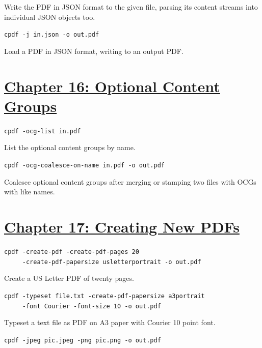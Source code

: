 \documentclass{book}
\begin{document}
\noindent Write the PDF in JSON format to the given file, parsing its content streams into individual JSON objects too.

\begin{framed}\noindent\texttt{cpdf -j in.json -o out.pdf}\end{framed}

\noindent Load a PDF in JSON format, writing to an output PDF.

\section*{\hyperref[chap:16]{Chapter 16: Optional Content Groups}}

\begin{framed}\noindent\texttt{cpdf -ocg-list in.pdf}\end{framed}

\noindent List the optional content groups by name.

\begin{framed}\noindent\texttt{cpdf -ocg-coalesce-on-name in.pdf -o out.pdf}\end{framed}

\noindent Coalesce optional content groups after merging or stamping two files with OCGs with like names.

\section*{\hyperref[chap:17]{Chapter 17: Creating New PDFs}}

\begin{framed}
 \noindent\small\verb?cpdf -create-pdf -create-pdf-pages 20?\\
 \noindent\small\verb?     -create-pdf-papersize usletterportrait -o out.pdf?
\end{framed}

\noindent Create a US Letter PDF of twenty pages.

\begin{framed}
 \noindent\small\verb?cpdf -typeset file.txt -create-pdf-papersize a3portrait?\\
 \noindent\small\verb?     -font Courier -font-size 10 -o out.pdf?
\end{framed}

\noindent Typeset a text file as PDF on A3 paper with Courier 10 point font.

\begin{framed}\noindent\texttt{cpdf -jpeg pic.jpeg -png pic.png -o out.pdf}\end{framed}
\end{document}
